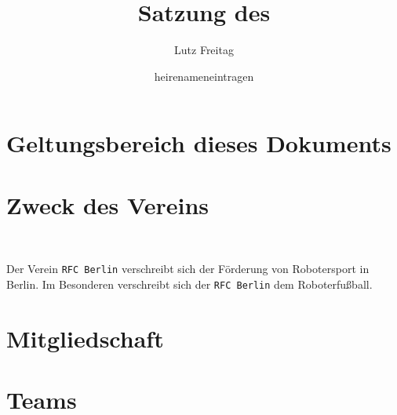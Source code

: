 \documentclass[11pt,a4paper]{scrartcl}
\author{Lutz Freitag \and heirenameneintragen}
\title{Satzung des \RFC}
\newcommand{\RFC}{\texttt{RFC Berlin}\xspace}
\begin{document}
\maketitle

\section{Geltungsbereich dieses Dokuments}\label{sec:scope}

\section{Zweck des Vereins}~\label{sec:purpose}

Der Verein \RFC verschreibt sich der Förderung von Robotersport in Berlin.
Im Besonderen verschreibt sich der \RFC dem Roboterfußball.

\section{Mitgliedschaft}\label{sec:mitgliedschaft}


\section{Teams}\label{sec:teams}
\end{document}
